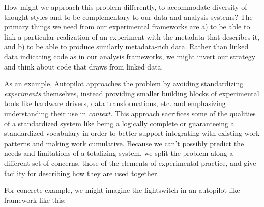 How might we approach this problem differently, to accommodate diversity
of thought styles and to be complementary to our data and analysis
systems? The primary things we need from our experimental frameworks are
a) to be able to link a particular realization of an experiment with the
metadata that describes it, and b) to be able to produce similarly
metadata-rich data. Rather than linked data indicating code as in our
analysis frameworks, we might invert our strategy and think about code
that draws from linked data.

As an example, \href{https://docs.auto-pi-lot.com}{Autopilot} \citep{saundersAutopilotAutomatingBehavioral2019}  approaches the problem by
avoiding standardizing \emph{experiments} themselves, instead providing
smaller building blocks of experimental tools like hardware drivers,
data transformations, etc. and emphasizing understanding their use in
\emph{context.} This approach sacrifices some of the qualities of a
standardized system like being a logically complete or guaranteeing a
standardized vocabulary in order to better support integrating with
existing work patterns and making work cumulative. Because we can't
possibly predict the needs and limitations of a totalizing system, we
split the problem along a different set of concerns, those of the
elements of experimental practice, and give facility for describing how
they are used together.

For concrete example, we might imagine the lightswitch in an
autopilot-like framework like this:

